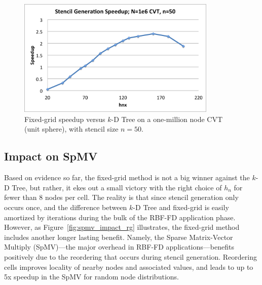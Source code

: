 \documentclass{report}
\begin{document}


\begin{figure}
\centering
\includegraphics[width=9.5cm]{../figures/stencils/cvt1m_stencil_gen_speedup.png}
\caption{Fixed-grid speedup versus $k$-D Tree on a one-million node CVT (unit sphere), with stencil size $n=50$.}
\label{fig:cvt_hn_speedup}
\end{figure}

\subsection{Impact on SpMV}

Based on evidence so far, the fixed-grid method is not a big winner against the $k$-D Tree, but rather, it ekes out a small victory with the right choice of $h_n$ for fewer than 8 nodes per cell. The reality is that since stencil generation only occurs once, and the difference between $k$-D Tree and fixed-grid is easily amortized by iterations during the bulk of the RBF-FD application phase. However, as Figure~\ref{fig:spmv_impact_rg} illustrates, the fixed-grid method includes another longer lasting benefit. Namely, the Sparse Matrix-Vector Multiply (SpMV)---the major overhead in RBF-FD applications---benefits positively due to the reordering that occurs during stencil generation. Reordering cells improves locality of nearby nodes and associated values, and leads to up to 5x speedup in the SpMV for random node distributions. 
\end{document}
